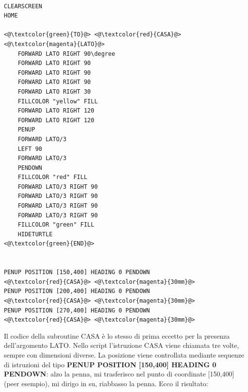 \lstset{extendedchars=true, basicstyle=\scriptsize} 
\begin{lstlisting}[frame=single]  % Start your code-block

CLEARSCREEN
HOME

<@\textcolor{green}{TO}@> <@\textcolor{red}{CASA}@> <@\textcolor{magenta}{LATO}@>
	FORWARD LATO RIGHT 90\degree
	FORWARD LATO RIGHT 90
	FORWARD LATO RIGHT 90
	FORWARD LATO RIGHT 90
	FORWARD LATO RIGHT 30
	FILLCOLOR "yellow" FILL
	FORWARD LATO RIGHT 120
	FORWARD LATO RIGHT 120
	PENUP
	FORWARD LATO/3
	LEFT 90
	FORWARD LATO/3
	PENDOWN
	FILLCOLOR "red" FILL
	FORWARD LATO/3 RIGHT 90
	FORWARD LATO/3 RIGHT 90
	FORWARD LATO/3 RIGHT 90
	FORWARD LATO/3 RIGHT 90
	FILLCOLOR "green" FILL
	HIDETURTLE
<@\textcolor{green}{END}@>


PENUP POSITION [150,400] HEADING 0 PENDOWN
<@\textcolor{red}{CASA}@> <@\textcolor{magenta}{30mm}@>
PENUP POSITION [200,400] HEADING 0 PENDOWN
<@\textcolor{red}{CASA}@> <@\textcolor{magenta}{30mm}@>
PENUP POSITION [270,400] HEADING 0 PENDOWN
<@\textcolor{red}{CASA}@> <@\textcolor{magenta}{30mm}@>

\end{lstlisting}

\vskip 1cm

Il codice della subroutine \color{red}CASA \color{black}è lo stesso di prima eccetto per la presenza dell'argomento \color{magenta}LATO\color{black}. Nello script l'istruzione \color{red}CASA \color{black}viene chiamata tre volte, sempre con dimensioni diverse. La posizione viene controllata mediante sequenze di istruzioni del tipo \textbf{PENUP POSITION [150,400] HEADING 0 PENDOWN}: alzo la penna, mi trasferisco nel punto di coordinate [150,400] (peer esempio), mi dirigo in su, riabbasso la penna. Ecco il risultato:

